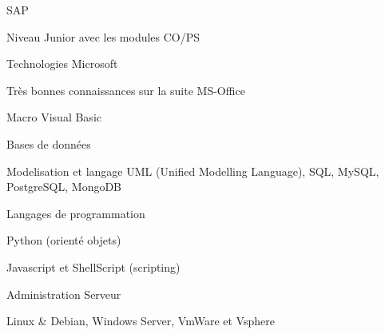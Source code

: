 

\begin{cventries}
	
	\zcventry
	{SAP} %
	{
		\begin{cvitems} %
			\item {Niveau Junior avec les modules CO/PS}
		\end{cvitems}
	}

	\zcventry
	{Technologies Microsoft} %
	{
		\begin{cvitems} %
			\item {Très bonnes connaissances sur la suite MS-Office}
			\item {Macro Visual Basic}
		\end{cvitems}
	}
	
	\zcventry
	{Bases de données} %
	{
		\begin{cvitems} %
			\item {Modelisation et langage UML (Unified Modelling Language), SQL, MySQL, PostgreSQL, MongoDB}
		\end{cvitems}
	}
	
	\zcventry
	{Langages de programmation} %
	{
		\begin{cvitems} %
			\item {Python (orienté objets)}
			\item {Javascript et ShellScript (scripting)}
		\end{cvitems}
	}
	
	\zcventry
	{Administration Serveur} %
	{
		\begin{cvitems} %
			\item {Linux \& Debian, Windows Server, VmWare et Vsphere}
		\end{cvitems}
	}
	

\end{cventries}
